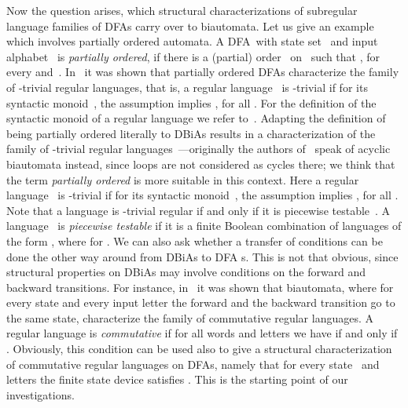 \documentclass[submission]{eptcs}
\newcommand{\dfa}{\textrm{DFA}}
\newcommand{\dbia}{\textrm{DBiA}}
\begin{document}
Now the question arises, which structural characterizations of
subregular language families of \dfa s carry over to biautomata. Let
us give an example which involves partially ordered automata. A \dfa\
with state set~ and input alphabet~ is \emph{partially
  ordered}, if there is a (partial) order~ on~ such that
, for every 
and~. In~\cite{BrFi80} it was shown that partially ordered
\dfa s characterize the family of -trivial regular
languages, that is, a regular language~ is -trivial if
for its syntactic monoid~, the assumption  implies
, for all . For the definition of the syntactic
monoid of a regular language we refer to~\cite{Ar69}. Adapting the
definition of being partially ordered literally to \dbia s results in
a characterization of the family of -trivial regular
languages~\cite{KlPo12a,KlPo12}---originally the authors
of~\cite{KlPo12} speak of acyclic biautomata instead, since loops are
not considered as cycles there; we think that the term \emph{partially
  ordered} is more suitable in this context. Here a regular
language~ is -trivial if for its syntactic
monoid~, the assumption  implies , for all
. Note that a language is -trivial regular if
and only if it is piecewise testable~\cite{Si75}. A
language~ is \emph{piecewise testable} if it is a
finite Boolean combination of languages of the form
, where
 for . We can also ask whether a transfer
of conditions can be done the other way around from \dbia s to \dfa
s. This is not that obvious, since structural properties on \dbia s
may involve conditions on the forward and backward transitions. For
instance, in~\cite{HoJa13c} it was shown that biautomata, where for
every state and every input letter the forward and the backward
transition go to the same state, characterize the family of
commutative regular languages. A regular language 
is \emph{commutative} if for all words  and letters
 we have  if and only if . Obviously, this condition can be used also to give a structural
characterization of commutative regular languages on \dfa s, namely
that for every state~ and letters  the finite state
device satisfies . This
is the starting point of our investigations.
\end{document}
